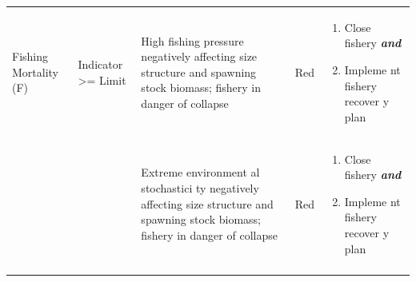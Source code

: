 \documentclass[]{book}
\begin{document}
\begin{longtable}[]{@{}lllll@{}}
\begin{minipage}[t]{0.19\columnwidth}
Fishing Mortality (F)\strut
\end{minipage} & \begin{minipage}[t]{0.19\columnwidth}\raggedright\strut
Indicator \textgreater{}= Limit\strut
\end{minipage} & \begin{minipage}[t]{0.19\columnwidth}\raggedright\strut
High fishing pressure negatively affecting size structure and spawning
stock biomass; fishery in danger of collapse\strut
\end{minipage} & \begin{minipage}[t]{0.19\columnwidth}\raggedright\strut
Red\strut
\end{minipage} & \begin{minipage}[t]{0.19\columnwidth}\raggedright\strut
\begin{enumerate}
\def\labelenumi{\arabic{enumi}.}
\item
  Close fishery \textbf{\emph{and} }
\item
  Impleme nt fishery recover y plan
\end{enumerate}\strut
\end{minipage}\tabularnewline
\begin{minipage}[t]{0.19\columnwidth}\raggedright\strut
\strut
\end{minipage} & \begin{minipage}[t]{0.19\columnwidth}\raggedright\strut
\strut
\end{minipage} & \begin{minipage}[t]{0.19\columnwidth}\raggedright\strut
Extreme environment al stochastici ty negatively affecting size
structure and spawning stock biomass; fishery in danger of
collapse\strut
\end{minipage} & \begin{minipage}[t]{0.19\columnwidth}\raggedright\strut
Red\strut
\end{minipage} & \begin{minipage}[t]{0.19\columnwidth}\raggedright\strut
\begin{enumerate}
\def\labelenumi{\arabic{enumi}.}
\item
  Close fishery \textbf{\emph{and} }
\item
  Impleme nt fishery recover y plan
\end{enumerate}\strut
\end{minipage}\tabularnewline
\begin{minipage}[t]{0.19\columnwidth}\raggedright\strut
\strut
\end{minipage} & \begin{minipage}[t]{0.19\columnwidth}\raggedright\strut

\end{minipage}
\end{longtable}
\end{document}
